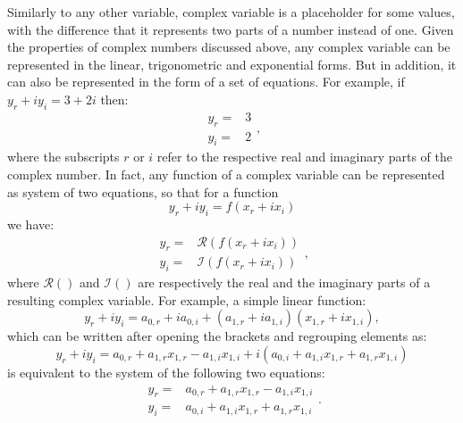 \documentclass[
]{book}
\begin{document}
Similarly to any other variable, complex variable is a placeholder for some values, with the difference that it represents two parts of a number instead of one. Given the properties of complex numbers discussed above, any complex variable can be represented in the linear, trigonometric and exponential forms. But in addition, it can also be represented in the form of a set of equations. For example, if \(y_r + i y_i = 3+2i\) then:
\begin{equation}
    \begin{aligned}
        y_r = & 3 \\
        y_i = & 2
    \end{aligned} ,
    \label{eq:complexVariablesSystem}
\end{equation}
where the subscripts \(r\) or \(i\) refer to the respective real and imaginary parts of the complex number. In fact, any function of a complex variable can be represented as system of two equations, so that for a function
\begin{equation}
    y_{r} + i y_{i} = f(x_r+ix_i)
    \label{eq:complexFunction}
\end{equation}
we have:
\begin{equation}
    \begin{aligned}
        y_r = & \mathcal{R}(f(x_r+ix_i)) \\
        y_i = & \mathcal{I}(f(x_r+ix_i))
    \end{aligned} ,
    \label{eq:complexFunctionSystem}
\end{equation}
where \(\mathcal{R}()\) and \(\mathcal{I}()\) are respectively the real and the imaginary parts of a resulting complex variable. For example, a simple linear function:
\begin{equation*}
    y_r + i y_i = a_{0,r} + i a_{0,i} + (a_{1,r} + i a_{1,i}) (x_{1,r} + i x_{1,i}),
\end{equation*}
which can be written after opening the brackets and regrouping elements as:
\begin{equation*}
    y_r + i y_i = a_{0,r} + a_{1,r} x_{1,r} - a_{1,i} x_{1,i} + i \left( a_{0,i} + a_{1,i} x_{1,r} + a_{1,r} x_{1,i} \right)
\end{equation*}
is equivalent to the system of the following two equations:
\begin{equation*}
    \begin{aligned}
        y_r = & a_{0,r} + a_{1,r} x_{1,r} - a_{1,i} x_{1,i} \\
        y_i = & a_{0,i} + a_{1,i} x_{1,r} + a_{1,r} x_{1,i}
    \end{aligned} .
\end{equation*}
\end{document}
